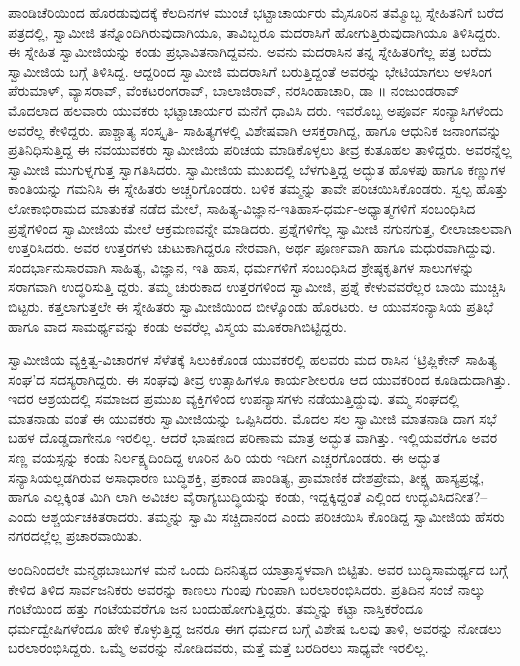 ಪಾಂಡಿಚೆರಿಯಿಂದ ಹೊರಡುವುದಕ್ಕೆ ಕೆಲದಿನಗಳ ಮುಂಚೆ ಭಟ್ಟಾಚಾರ್ಯರು ಮೈಸೂರಿನ ತಮ್ಮೊಬ್ಬ ಸ್ನೇಹಿತನಿಗೆ ಬರೆದ ಪತ್ರದಲ್ಲಿ, ಸ್ವಾಮೀಜಿ ತನ್ನೊಂದಿಗಿರುವುದಾಗಿಯೂ, ತಾವಿಬ್ಬರೂ ಮದರಾಸಿಗೆ ಹೋಗುತ್ತಿರುವುದಾಗಿಯೂ ತಿಳಿಸಿದ್ದರು. ಈ ಸ್ನೇಹಿತ ಸ್ವಾಮೀಜಿಯನ್ನು ಕಂಡು ಪ್ರಭಾವಿತನಾಗಿದ್ದವನು. ಅವನು ಮದರಾಸಿನ ತನ್ನ ಸ್ನೇಹಿತರಿಗೆಲ್ಲ ಪತ್ರ ಬರೆದು ಸ್ವಾಮೀಜಿಯ ಬಗ್ಗೆ ತಿಳಿಸಿದ್ದ. ಆದ್ದರಿಂದ ಸ್ವಾಮೀಜಿ ಮದರಾಸಿಗೆ ಬರುತ್ತಿದ್ದಂತೆ ಅವರನ್ನು ಭೇಟಿಯಾಗಲು ಅಳಸಿಂಗ ಪೆರುಮಾಳ್, ವ್ಯಾಸರಾವ್, ವೆಂಕಟರಂಗರಾವ್, ಬಾಲಾಜಿರಾವ್, ನರಸಿಂಹಾಚಾರಿ, ಡಾ ॥ ನಂಜುಂಡರಾವ್ ಮೊದಲಾದ ಹಲವಾರು ಯುವಕರು ಭಟ್ಟಾಚಾರ್ಯರ ಮನೆಗೆ ಧಾವಿಸಿ ದರು. ಇವರೊಬ್ಬ ಅಪೂರ್ವ ಸಂನ್ಯಾಸಿಗಳೆಂದು ಅವರೆಲ್ಲ ಕೇಳಿದ್ದರು. ಪಾಶ್ಚಾತ್ಯ ಸಂಸ್ಕೃತಿ- ಸಾಹಿತ್ಯಗಳಲ್ಲಿ ವಿಶೇಷವಾಗಿ ಆಸಕ್ತರಾಗಿದ್ದ, ಹಾಗೂ ಆಧುನಿಕ ಜನಾಂಗವನ್ನು ಪ್ರತಿನಿಧಿಸುತ್ತಿದ್ದ ಈ ನವಯುವಕರು ಸ್ವಾಮೀಜಿಯ ಪರಿಚಯ ಮಾಡಿಕೊಳ್ಳಲು ತೀವ್ರ ಕುತೂಹಲ ತಾಳಿದ್ದರು. ಅವರನ್ನೆಲ್ಲ ಸ್ವಾಮೀಜಿ ಮುಗುಳ್ನಗುತ್ತ ಸ್ವಾಗತಿಸಿದರು. ಸ್ವಾಮೀಜಿಯ ಮುಖದಲ್ಲಿ ಬೆಳಗುತ್ತಿದ್ದ ಅದ್ಭುತ ಹೊಳಪು ಹಾಗೂ ಕಣ್ಣುಗಳ ಕಾಂತಿಯನ್ನು ಗಮನಿಸಿ ಈ ಸ್ನೇಹಿತರು ಅಚ್ಚರಿಗೊಂಡರು. ಬಳಿಕ ತಮ್ಮನ್ನು ತಾವೇ ಪರಿಚಯಿಸಿಕೊಂಡರು. ಸ್ವಲ್ಪ ಹೊತ್ತು ಲೋಕಾಭಿರಾಮದ ಮಾತುಕತೆ ನಡೆದ ಮೇಲೆ, ಸಾಹಿತ್ಯ-ವಿಜ್ಞಾನ-ಇತಿಹಾಸ-ಧರ್ಮ-ಅಧ್ಯಾತ್ಮಗಳಿಗೆ ಸಂಬಂಧಿಸಿದ ಪ್ರಶ್ನೆಗಳಿಂದ ಸ್ವಾಮೀಜಿಯ ಮೇಲೆ ಆಕ್ರಮಣವನ್ನೇ ಮಾಡಿದರು. ಪ್ರಶ್ನೆಗಳಿಗೆಲ್ಲ ಸ್ವಾಮೀಜಿ ನಗುನಗುತ್ತ, ಲೀಲಾಜಾಲವಾಗಿ ಉತ್ತರಿಸಿದರು. ಅವರ ಉತ್ತರಗಳು ಚುಟುಕಾಗಿದ್ದರೂ ನೇರವಾಗಿ, ಅರ್ಥ ಪೂರ್ಣವಾಗಿ ಹಾಗೂ ಮಧುರವಾಗಿದ್ದುವು. ಸಂದರ್ಭಾನುಸಾರವಾಗಿ ಸಾಹಿತ್ಯ, ವಿಜ್ಞಾನ, ಇತಿ ಹಾಸ, ಧರ್ಮಗಳಿಗೆ ಸಂಬಂಧಿಸಿದ ಶ್ರೇಷ್ಠಕೃತಿಗಳ ಸಾಲುಗಳನ್ನು ಸರಾಗವಾಗಿ ಉದ್ಧರಿಸುತ್ತಿ ದ್ದರು. ತಮ್ಮ ಚುರುಕಾದ ಉತ್ತರಗಳಿಂದ ಸ್ವಾಮೀಜಿ, ಪ್ರಶ್ನೆ ಕೇಳುವವರೆಲ್ಲರ ಬಾಯಿ ಮುಚ್ಚಿಸಿ ಬಿಟ್ಟರು. ಕತ್ತಲಾಗುತ್ತಲೇ ಈ ಸ್ನೇಹಿತರು ಸ್ವಾಮೀಜಿಯಿಂದ ಬೀಳ್ಕೊಂಡು ಹೊರಟರು. ಆ ಯುವಸಂನ್ಯಾಸಿಯ ಪ್ರತಿಭೆ ಹಾಗೂ ವಾದ ಸಾಮರ್ಥ್ಯವನ್ನು ಕಂಡು ಅವರೆಲ್ಲ ವಿಸ್ಮಯ ಮೂಕರಾಗಿಬಿಟ್ಟಿದ್ದರು.

ಸ್ವಾಮೀಜಿಯ ವ್ಯಕ್ತಿತ್ವ-ವಿಚಾರಗಳ ಸೆಳೆತಕ್ಕೆ ಸಿಲುಕಿಕೊಂಡ ಯುವಕರಲ್ಲಿ ಹಲವರು ಮದ ರಾಸಿನ ‘ಟ್ರಿಪ್ಲಿಕೇನ್ ಸಾಹಿತ್ಯ ಸಂಘ’ದ ಸದಸ್ಯರಾಗಿದ್ದರು. ಈ ಸಂಘವು ತೀವ್ರ ಉತ್ಸಾಹಿಗಳೂ ಕಾರ್ಯಶೀಲರೂ ಆದ ಯುವಕರಿಂದ ಕೂಡಿದುದಾಗಿತ್ತು. ಇದರ ಆಶ್ರಯದಲ್ಲಿ ಸಮಾಜದ ಪ್ರಮುಖ ವ್ಯಕ್ತಿಗಳಿಂದ ಉಪನ್ಯಾಸಗಳು ನಡೆಯುತ್ತಿದ್ದುವು. ತಮ್ಮ ಸಂಘದಲ್ಲಿ ಮಾತನಾಡು ವಂತೆ ಈ ಯುವಕರು ಸ್ವಾಮೀಜಿಯನ್ನು ಒಪ್ಪಿಸಿದರು. ಮೊದಲ ಸಲ ಸ್ವಾಮೀಜಿ ಮಾತನಾಡಿ ದಾಗ ಸಭೆ ಬಹಳ ದೊಡ್ಡದಾಗೇನೂ ಇರಲಿಲ್ಲ. ಆದರೆ ಭಾಷಣದ ಪರಿಣಾಮ ಮಾತ್ರ ಅದ್ಭುತ ವಾಗಿತ್ತು. ಇಲ್ಲಿಯವರೆಗೂ ಅವರ ಸಣ್ಣ ವಯಸ್ಸನ್ನು ಕಂಡು ನಿರ್ಲಕ್ಷ್ಯದಿಂದಿದ್ದ ಊರಿನ ಹಿರಿ ಯರು ಇದೀಗ ಎಚ್ಚರಗೊಂಡರು. ಈ ಅದ್ಭುತ ಸನ್ಯಾಸಿಯಲ್ಲಡಗಿರುವ ಅಸಾಧಾರಣ ಬುದ್ಧಿಶಕ್ತಿ, ಪ್ರಕಾಂಡ ಪಾಂಡಿತ್ಯ, ಪ್ರಾಮಾಣಿಕ ದೇಶಪ್ರೇಮ, ತೀಕ್ಷ್ಣ ಹಾಸ್ಯಪ್ರಜ್ಞೆ, ಹಾಗೂ ಎಲ್ಲಕ್ಕಿಂತ ಮಿಗಿ ಲಾಗಿ ಅವಿಚಲ ವೈರಾಗ್ಯಬುದ್ಧಿಯನ್ನು ಕಂಡು, ಇದ್ದಕ್ಕಿದ್ದಂತೆ ಎಲ್ಲಿಂದ ಉದ್ಭವಿಸಿದನೀತ?– ಎಂದು ಆಶ್ಚರ್ಯಚಕಿತರಾದರು. ತಮ್ಮನ್ನು ಸ್ವಾಮಿ ಸಚ್ಚಿದಾನಂದ ಎಂದು ಪರಿಚಯಿಸಿ ಕೊಂಡಿದ್ದ ಸ್ವಾಮೀಜಿಯ ಹೆಸರು ನಗರದಲ್ಲೆಲ್ಲ ಪ್ರಚಾರವಾಯಿತು.

ಅಂದಿನಿಂದಲೇ ಮನ್ಮಥಬಾಬುಗಳ ಮನೆ ಒಂದು ದಿನನಿತ್ಯದ ಯಾತ್ರಾಸ್ಥಳವಾಗಿ ಬಿಟ್ಟಿತು. ಅವರ ಬುದ್ಧಿಸಾಮರ್ಥ್ಯದ ಬಗ್ಗೆ ಕೇಳಿದ ತಿಳಿದ ಸಾರ್ವಜನಿಕರು ಅವರನ್ನು ಕಾಣಲು ಗುಂಪು ಗುಂಪಾಗಿ ಬರಲಾರಂಭಿಸಿದರು. ಪ್ರತಿದಿನ ಸಂಜೆ ನಾಲ್ಕು ಗಂಟೆಯಿಂದ ಹತ್ತು ಗಂಟೆಯವರೆಗೂ ಜನ ಬಂದುಹೋಗುತ್ತಿದ್ದರು. ತಮ್ಮನ್ನು ಕಟ್ಟಾ ನಾಸ್ತಿಕರೆಂದೂ ಧರ್ಮದ್ವೇಷಿಗಳೆಂದೂ ಹೇಳಿ ಕೊಳ್ಳುತ್ತಿದ್ದ ಜನರೂ ಈಗ ಧರ್ಮದ ಬಗ್ಗೆ ವಿಶೇಷ ಒಲವು ತಾಳಿ, ಅವರನ್ನು ನೋಡಲು ಬರಲಾರಂಭಿಸಿದ್ದರು. ಒಮ್ಮೆ ಅವರನ್ನು ನೋಡಿದವರು, ಮತ್ತೆ ಮತ್ತೆ ಬರದಿರಲು ಸಾಧ್ಯವೇ ಇರಲಿಲ್ಲ.

